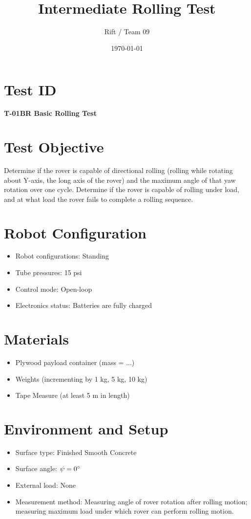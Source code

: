 \documentclass[11pt]{article}
\title{Intermediate Rolling Test}
\author{Rift / Team 09}
\date{\today}
\begin{document}
\maketitle

\section*{Test ID}
\textbf{T-01BR Basic Rolling Test} 

\section*{Test Objective}
Determine if the rover is capable of directional rolling (rolling while rotating about Y-axis, the long axis of the rover) and the maximum angle of that yaw rotation over one cycle. Determine if the rover is capable of rolling under load, and at what load the rover fails to complete a rolling sequence.

\section*{Robot Configuration}
\begin{itemize}[noitemsep]
    \item Robot configurations: Standing
    \item Tube pressures: 15 psi
    \item Control mode: Open-loop
    \item Electronics status: Batteries are fully charged
\end{itemize}

\section*{Materials}
\begin{itemize}[noitemsep]
    \item Plywood payload container (mass = ...)
    \item Weights (incrementing by 1 kg, 5 kg, 10 kg)
    \item Tape Measure (at least 5 m in length)
    
\end{itemize}

\section*{Environment and Setup}
\begin{itemize}[noitemsep]
    \item Surface type: Finished Smooth Concrete
    \item Surface angle: $\psi = 0 {\degree}$ 
    \item External load: None 
    \item Measurement method: Measuring angle of rover rotation after rolling motion; measuring maximum load under which rover can perform rolling motion.
\end{itemize}
\end{document}

